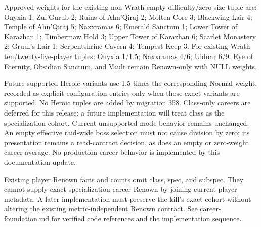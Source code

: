 \documentclass[11pt]{article}
\begin{document}
Approved weights for the existing non-Wrath empty-difficulty/zero-size tuple are: Onyxia 1; Zul'Gurub 2; Ruins of Ahn'Qiraj 2; Molten Core 3; Blackwing Lair 4; Temple of Ahn'Qiraj 5; Naxxramas 6; Emerald Sanctum 1; Lower Tower of Karazhan 1; Timbermaw Hold 3; Upper Tower of Karazhan 6; Scarlet Monastery 2; Gruul's Lair 1; Serpentshrine Cavern 4; Tempest Keep 3. For existing Wrath ten/twenty-five-player tuples: Onyxia 1/1.5; Naxxramas 4/6; Ulduar 6/9. Eye of Eternity, Obsidian Sanctum, and Vault remain Renown-only with NULL weights.

Future supported Heroic variants use 1.5 times the corresponding Normal weight, recorded as explicit configuration entries only when those exact variants are supported. No Heroic tuples are added by migration 358. Class-only careers are deferred for this release; a future implementation will treat class as the specialization cohort. Current unsupported-mode behavior remains unchanged. An empty effective raid-wide boss selection must not cause division by zero; its presentation remains a read-contract decision, as does an empty or zero-weight career average. No production career behavior is implemented by this documentation update.

Existing player Renown facts and counts omit class, spec, and subspec. They cannot supply exact-specialization career Renown by joining current player metadata. A later implementation must preserve the kill's exact cohort without altering the existing metric-independent Renown contract. See \href{career-foundation.md}{career-foundation.md} for verified code references and the implementation sequence.
\end{document}
